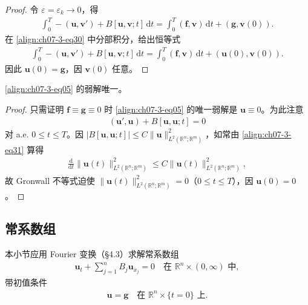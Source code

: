 \documentclass[../../main.tex]{subfiles}
\begin{document}
\begin{theorem}[弱解的存在性]
\begin{proof}
令 $\varepsilon=\varepsilon_k\to 0$，得
\begin{align*}
\int_0^T-(\mathbf{u},\mathbf{v}')+B[\mathbf{u},\mathbf{v};t]\,\mathrm{d}t=\int_0^T(\mathbf{f},\mathbf{v})\,\mathrm{d}t+(\mathbf{g},\mathbf{v}(0)).
\end{align*}
在 \eqref{align:ch07-3-eq30} 中分部积分，给出恒等式
\begin{align*}
\int_0^T-(\mathbf{u},\mathbf{v}')+B[\mathbf{u},\mathbf{v};t]\,\mathrm{d}t=\int_0^T(\mathbf{f},\mathbf{v})\,\mathrm{d}t+(\mathbf{u}(0),\mathbf{v}(0)).
\end{align*}
因此 $\mathbf{u}(0)=\mathbf{g}$，因 $\mathbf{v}(0)$ 任意。
\end{proof}
\end{theorem}

\begin{theorem}[弱解的唯一性]\label{theorem:ch07-3-4-弱解唯一}
\eqref{align:ch07-3-eq05} 的弱解唯一。
\begin{proof}
只需证明 $\mathbf{f}\equiv\mathbf{g}\equiv 0$ 时 \eqref{align:ch07-3-eq05} 的唯一弱解是 $\mathbf{u}\equiv 0$。为此注意
\begin{align}
(\mathbf{u}',\mathbf{u})+B[\mathbf{u},\mathbf{u};t]=0\label{align:ch07-3-eq31}
\end{align}
对 a.e. $0\leqslant t\leqslant T$。因 $|B[\mathbf{u},\mathbf{u};t]|\leqslant C\|\mathbf{u}\|_{L^2(\mathbb{R}^n;\mathbb{R}^m)}^2$，如常由 \eqref{align:ch07-3-eq31} 算得
\begin{align*}
\frac{\mathrm{d}}{\mathrm{d}t}\|\mathbf{u}(t)\|_{L^2(\mathbb{R}^n;\mathbb{R}^m)}^2\leqslant C\|\mathbf{u}(t)\|_{L^2(\mathbb{R}^n;\mathbb{R}^m)}^2,
\end{align*}
故 Gronwall 不等式迫使 $\|\mathbf{u}(t)\|_{L^2(\mathbb{R}^n;\mathbb{R}^m)}^2=0$（$0\leqslant t\leqslant T$），因 $\mathbf{u}(0)=0$。
\end{proof}
\end{theorem}

\subsection{常系数组}\label{subsection:ch07-3-3-常系数组}

本小节应用 Fourier 变换（\S4.3）求解常系数组
\begin{align}
\mathbf{u}_t+\sum_{j=1}^nB_j\mathbf{u}_{x_j}=0\quad\text{在 }\mathbb{R}^n\times(0,\infty)\text{ 中},\label{align:ch07-3-eq32}
\end{align}
带初值条件
\begin{align}
\mathbf{u}=\mathbf{g}\quad\text{在 }\mathbb{R}^n\times\{t=0\}\text{ 上}.\label{align:ch07-3-eq33}
\end{align}
\end{document}
